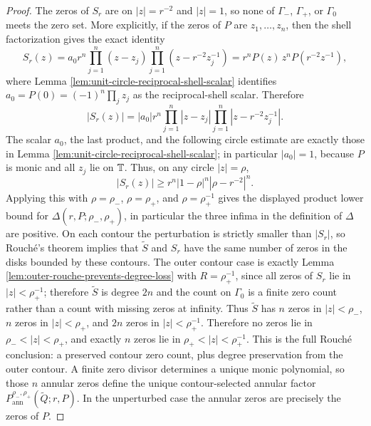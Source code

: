 \begin{proof}
The zeros of \(S_r\) are on \(|z|=r^{-2}\) and \(|z|=1\), so none of \(\Gamma_-\), \(\Gamma_+\), or \(\Gamma_0\) meets the zero set.  More explicitly, if the zeros of \(P\) are \(z_1,\dots,z_n\), then the shell factorization gives the exact identity
\[
S_r(z)
=a_0r^n\prod_{j=1}^n(z-z_j)
\prod_{j=1}^n(z-r^{-2}z_j^{-1})
=r^nP(z)\,z^nP(r^{-2}z^{-1}),
\]
where Lemma \ref{lem:unit-circle-reciprocal-shell-scalar} identifies
\(a_0=P(0)=(-1)^n\prod_jz_j\) as the reciprocal-shell scalar.  Therefore
\[
|S_r(z)|
=|a_0|r^n\prod_{j=1}^n |z-z_j|\prod_{j=1}^n |z-r^{-2}z_j^{-1}|.
\]
The scalar \(a_0\), the last product, and the following circle estimate
are exactly those in Lemma \ref{lem:unit-circle-reciprocal-shell-scalar};
in particular \(|a_0|=1\), because \(P\) is monic and all \(z_j\) lie on
\(\mathbb{T}\).  Thus, on any circle \(|z|=\rho\),
\[
|S_r(z)|\ge r^n |1-\rho|^n|\rho-r^{-2}|^n.
\]
Applying this with \(\rho=\rho_-\), \(\rho=\rho_+\), and
\(\rho=\rho_+^{-1}\) gives the displayed product lower bound for
\(\Delta(r,P;\rho_-,\rho_+)\), in particular the three infima in the
definition of \(\Delta\) are positive.  On each contour the perturbation is strictly smaller than \(|S_r|\), so Rouch\'e's theorem implies that \(\widetilde S\) and \(S_r\) have the same number of zeros in the disks bounded by these contours.  The outer contour case is exactly Lemma \ref{lem:outer-rouche-prevents-degree-loss} with \(R=\rho_+^{-1}\), since all zeros of \(S_r\) lie in \(|z|<\rho_+^{-1}\); therefore \(\widetilde S\) is degree \(2n\) and the count on \(\Gamma_0\) is a finite zero count rather than a count with missing zeros at infinity.  Thus \(\widetilde S\) has \(n\) zeros in \(|z|<\rho_-\), \(n\) zeros in \(|z|<\rho_+\), and \(2n\) zeros in \(|z|<\rho_+^{-1}\).  Therefore no zeros lie in \(\rho_-<|z|<\rho_+\), and exactly \(n\) zeros lie in \(\rho_+<|z|<\rho_+^{-1}\).  This is the full Rouch\'e conclusion: a preserved contour zero count, plus degree preservation from the outer contour.  A finite zero divisor determines a unique monic polynomial, so those \(n\) annular zeros define the unique contour-selected annular factor \(P_{\mathrm{ann}}^{\rho_-,\rho_+}(\widetilde Q;r,P)\).  In the unperturbed case the annular zeros are precisely the zeros of \(P\).


\end{proof}
